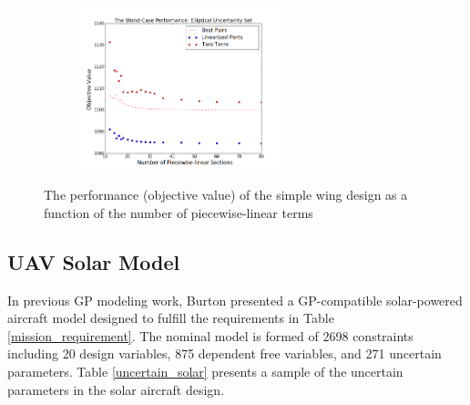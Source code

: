 \begin{figure}[H]
\begin{subfigure}{0.49\textwidth}
    \end{subfigure}%
    \begin{subfigure}{0.49\textwidth}
        \centering
        \includegraphics[height=1.85in]{simple_wing_results/ell_worst_pwl.png}
    \end{subfigure}
    \caption{The performance (objective value) of the simple wing design as a function of the number of piecewise-linear terms}  %
    \label{simple_wing_var_pwl}
\end{figure}


\subsection{UAV Solar Model}
In previous GP modeling work, Burton presented a GP-compatible solar-powered aircraft model \cite{burton_hoburg} designed to fulfill the requirements in Table \ref{mission_requirement}. The nominal model is formed of 2698 constraints including 20 design variables, 875 dependent free variables, and 271 uncertain parameters. Table \ref{uncertain_solar} presents a sample of the uncertain parameters in the solar aircraft design.\\

